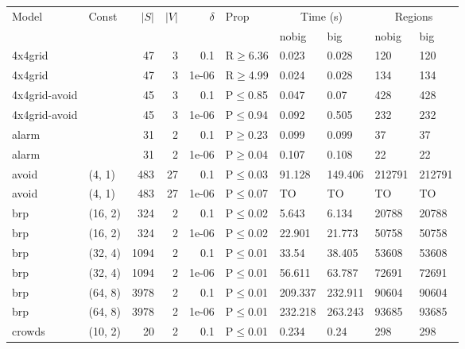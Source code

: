 \begin{longtable}{llrrrlllll}

        \toprule
        Model & Const & $|S|$ & $|V|$ & $\delta$ & Prop & \multicolumn{2}{c}{Time (s)} & \multicolumn{2}{c}{Regions} \\
        \cmidrule(ll){7-8} \cmidrule(ll){9-10}
        & & & & & & nobig & big & nobig & big \\
        \midrule
        
 4x4grid       &           &     	47 &   3 & 0.1   & R$\geq$6.36  & 0.023   & 0.028   & 120    & 120    \\
 4x4grid       &           &     	47 &   3 & 1e-06 & R$\geq$4.99  & 0.024   & 0.028   & 134    & 134    \\
 4x4grid-avoid &           &     	45 &   3 & 0.1   & P$\leq$0.85  & 0.047   & 0.07    & 428    & 428    \\
 4x4grid-avoid &           &     	45 &   3 & 1e-06 & P$\leq$0.94  & 0.092   & 0.505   & 232    & 232    \\
 alarm         &           &     	31 &   2 & 0.1   & P$\geq$0.23  & 0.099   & 0.099   & 37     & 37     \\
 alarm         &           &     	31 &   2 & 1e-06 & P$\geq$0.04  & 0.107   & 0.108   & 22     & 22     \\
 avoid         & (4, 1)    &    	483 &  27 & 0.1   & P$\leq$0.03  & 91.128  & 149.406 & 212791 & 212791 \\
 avoid         & (4, 1)    &    	483 &  27 & 1e-06 & P$\leq$0.07  & TO      & TO      & TO     & TO     \\
 brp           & (16, 2)   &    	324 &   2 & 0.1   & P$\leq$0.02  & 5.643   & 6.134   & 20788  & 20788  \\
 brp           & (16, 2)   &    	324 &   2 & 1e-06 & P$\leq$0.02  & 22.901  & 21.773  & 50758  & 50758  \\
 brp           & (32, 4)   &   	1094 &   2 & 0.1   & P$\leq$0.01  & 33.54   & 38.405  & 53608  & 53608  \\
 brp           & (32, 4)   &   	1094 &   2 & 1e-06 & P$\leq$0.01  & 56.611  & 63.787  & 72691  & 72691  \\
 brp           & (64, 8)   &   	3978 &   2 & 0.1   & P$\leq$0.01  & 209.337 & 232.911 & 90604  & 90604  \\
 brp           & (64, 8)   &   	3978 &   2 & 1e-06 & P$\leq$0.01  & 232.218 & 263.243 & 93685  & 93685  \\
 crowds        & (10, 2)   &     	20 &   2 & 0.1   & P$\leq$0.01  & 0.234   & 0.24    & 298    & 298    \\

\end{longtable}
